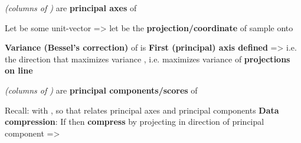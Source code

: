 \hSep %

 \emph{(columns of )} are \textbf{principal axes} of 

Let  be some unit-vector => let
 be the
\textbf{projection/coordinate} of sample  onto

\begin{itemize}

      \vItem
            \textbf{Variance (Bessel's correction)} of
             is
      \vItem
            \textbf{First (principal) axis defined} =\textgreater{}
      \vItem
            i.e.  the direction that maximizes
            variance , i.e. maximizes
            variance of \textbf{projections on line}
\end{itemize}

\emph{(columns of )} are \textbf{principal
      components/scores} of 

\begin{itemize}

      \vItem
            Recall:
            with , so that
            relates principal axes and principal components
      \vItem
            \textbf{Data compression}: If 
            then \textbf{compress}  by projecting in direction of
            principal component =\textgreater{}
\end{itemize}
